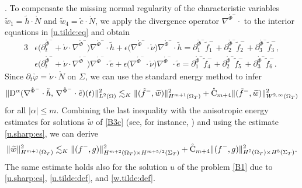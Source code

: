 \documentclass[twoside,11pt]{article}
\numberwithin{equation}{section}
\def\p{\partial}
\begin{document}
\vspace*{2mm}
.\quad
To compensate the missing normal regularity of the characteristic variables $\widetilde{w}_1=\tilde{h}\cdot\mathring{N}$
and $\widetilde{w}_4=\tilde{e}\cdot\mathring{N}$,
we apply the
divergence operator $\nabla^{\mathring{\Phi}^-}\cdot$ to the interior equations in \eqref{u.tilde:eq} and obtain
\begin{alignat}{3}
\nonumber	%
&	\epsilon \big(\p_t^{\mathring{\Phi}^-}+\mathring{\nu}\cdot \nabla^{\mathring{\Phi}^-}\big) \nabla^{\mathring{\Phi}^-}\cdot \tilde{h}+\epsilon \big(\nabla^{\mathring{\Phi}^-}\cdot \mathring{\nu}\big) \nabla^{\mathring{\Phi}^-}\cdot \tilde{h}=
	\p_1^{\mathring{\Phi}^-}\tilde{f}_1^-  +  	\p_2^{\mathring{\Phi}^-}\tilde{f}_2^-
	+  	\p_3^{\mathring{\Phi}^-}\tilde{f}_3^-,\\
&	\epsilon \big(\p_t^{\mathring{\Phi}^-}+\mathring{\nu}\cdot \nabla^{\mathring{\Phi}^-}\big) \nabla^{\mathring{\Phi}^-}\cdot \tilde{e}+\epsilon \big(\nabla^{\mathring{\Phi}^-}\cdot \mathring{\nu}\big) \nabla^{\mathring{\Phi}^-}\cdot \tilde{e}=
\p_1^{\mathring{\Phi}^-}\tilde{f}_4^-  +  	\p_2^{\mathring{\Phi}^-}\tilde{f}_5^-
+  	\p_3^{\mathring{\Phi}^-}\tilde{f}_6^-.
\nonumber
\end{alignat}
Since $\p_t\mathring{\varphi}=\mathring{\nu}\cdot \mathring{N}$ on $\Sigma$, we can use the standard energy method %
to infer
\begin{align} \nonumber
\|\mathrm{D}^{\alpha}(\nabla^{\mathring{\Phi}^-}\cdot \tilde{h},\, \nabla^{\mathring{\Phi}^-}\cdot \tilde{e})(t) \|_{L^2(\Omega)}^2
	\lesssim_K
	\|(\tilde{f}^-, \widetilde{w})\|_{H^{m+1}(\Omega_{T})}^2
	+ \mathring{\rm C}_{m+4}
	\|(\tilde{f}^-, \widetilde{w})\|_{W^{2,\infty}(\Omega_{T})}^2
\end{align}
for all $|\alpha|\leq m$.
Combining the last inequality with the anisotropic energy estimates for solutions $\widetilde{w}$ of \eqref{B3c} (see, for instance, \cite[Theorem A]{S95MMASMR1346663}) and using the estimate \eqref{u.sharp:es}, we can derive %
\begin{align} \nonumber
	\| \widetilde{w} \|_{H^{m+1}(\Omega_{T})}^2
	\lesssim_K
	\|(f^-, g)\|_{H^{m+2}(\Omega_{T})\times H^{m+5/2}(\Sigma_T)}^2
	+ \mathring{\rm C}_{m+4}
	\|(f^-, g)\|_{H^{7}(\Omega_{T})\times H^{8}(\Sigma_T)}^2.
\end{align}
The same estimate holds also for the solution $u$ of the problem \eqref{B1} due to \eqref{u.sharp:es}, \eqref{u.tilde:def}, and \eqref{w.tilde:def}.
\end{document}
